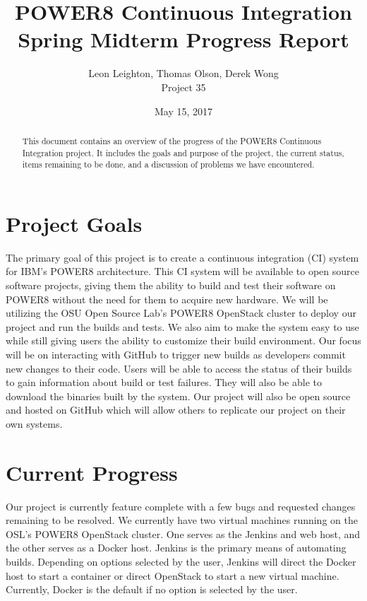 \documentclass[10pt,onecolumn,journal,draftclsnofoot]{IEEEtran}
\begin{document}
\begin{titlepage}
  \title{POWER8 Continuous Integration\\ Spring Midterm Progress Report}
  \author{Leon Leighton, Thomas Olson, Derek Wong\\Project 35}
  \date{May 15, 2017}
  \maketitle
  \vspace{4cm}
  \begin{abstract}
  \noindent This document contains an overview of the progress of the POWER8 Continuous Integration project.
    It includes the goals and purpose of the project, the current status, items remaining to be done, 
    and a discussion of problems we have encountered. 
 \end{abstract}
\end{titlepage}

\tableofcontents
\clearpage

\section{Project Goals}
The primary goal of this project is to create a continuous integration (CI) system for IBM's POWER8 architecture.
This CI system will be available to open source software projects, giving them the ability to build and test their software on POWER8 without the need for them to acquire new hardware.
We will be utilizing the OSU Open Source Lab's POWER8 OpenStack cluster to deploy our project and run the builds and tests.
We also aim to make the system easy to use while still giving users the ability to customize their build environment.
Our focus will be on interacting with GitHub to trigger new builds as developers commit new changes to their code.
Users will be able to access the status of their builds to gain information about build or test failures.
They will also be able to download the binaries built by the system.
Our project will also be open source and hosted on GitHub which will allow others to replicate our project on their own systems.

\section{Current Progress}
Our project is currently feature complete with a few bugs and requested changes remaining to be resolved.
We currently have two virtual machines running on the OSL's POWER8 OpenStack cluster. 
One serves as the Jenkins and web host, and the other serves as a Docker host. 
Jenkins is the primary means of automating builds.
Depending on options selected by the user, Jenkins will direct the Docker host to start a container or direct OpenStack to start
a new virtual machine. 
Currently, Docker is the default if no option is selected by the user.
\end{document}
